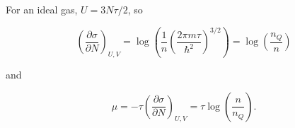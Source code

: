 \documentclass{article}
\begin{document}
\begin{enumerate}
	For an ideal gas, $U = 3N\tau/2$, so

	$$\left(\frac{\partial \sigma}{\partial N}\right)_{U,V} = \log \left(\frac{1}{n} \left( \frac{2 \pi m \tau}{\hbar^2} \right)^{3/2} \right) = \log \left( \frac{n_Q}{n} \right)$$

	and

	$$\mu = -\tau \left(\frac{\partial \sigma}{\partial N}\right)_{U,V} = \tau \log \left( \frac{n}{n_Q} \right).$$
	

\end{enumerate}
\end{document}

